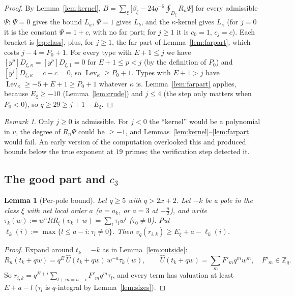 \documentclass{amsart}
\newtheorem{lemma}[theorem]{Lemma}
\theoremstyle{definition}
\theoremstyle{remark}
\newtheorem{remark}[theorem]{Remark}
\numberwithin{equation}{section}
\newcommand{\Z}{\mathbb{Z}}
\newcommand{\Lev}{\operatorname{Lev}}
\begin{document}
\begin{proof}
By Lemma~\ref{lem:kernel},
$B=\sum_\xi\bigl[\beta_\xi-24q^{-5}\oint_{D_\xi}R_n\Psi\bigr]$ for every
admissible $\Psi$: $\Psi=0$ gives the bound $L_a$, $\Psi=1$ gives $L_b$, and
the $\kappa$-kernel gives $L_\kappa$ (for $j=0$ it is the constant
$\Psi=1+c$, with no far part; for $j\ge1$ it is $c_0=1$, $c_j=c$). Each
bracket is \eqref{eq:class}, plus, for $j\ge1$, the far part of
Lemma~\ref{lem:farpart}, which costs $j-4=P_0+1$. For every type with
$E+1\le j$ we have $[y^p]D_{\xi,\kappa}=[y^p]D_{\xi,1}=0$ for $E+1\le p<j$
(by the definition of $P_0$) and $[y^j]D_{\xi,\kappa}=c-c=0$, so
$\Lev_\kappa\ge P_0+1$. Types with $E+1>j$ have
$\Lev_\kappa\ge-5+E+1\ge P_0+1$ whatever $\kappa$ is. Lemma~\ref{lem:farpart}
applies, because $E_\xi\ge-10$ (Lemma~\ref{lem:crude}) and $j\le4$ (the step
only matters when $P_0<0$), so $q\ge29\ge j+1-E_\xi$.
\end{proof}

\begin{remark}\label{rem:j-negative}
Only $j\ge0$ is admissible. For $j<0$ the ``kernel'' would be a polynomial in
$v$, the degree of $R_n\Psi$ could be $\ge-1$, and
Lemmas~\ref{lem:kernel}--\ref{lem:farpart} would fail. An early version of the
computation overlooked this and produced bounds below the true exponent at
$19$ primes; the verification step detected it.
\end{remark}

\subsection{The good part and \texorpdfstring{$c_3$}{c3}}\label{ss:good}

\begin{lemma}[Per-pole bound]\label{lem:perpole}
Let $q\ge5$ with $q>2x+2$. Let $-k$ be a pole in the class $\xi$ with net local
order $a$ ($a=a_k$, or $a=3$ at $-\frac n2$), and write
$\tau_k(w):=w^aRR_\xi(v_k+w)=\sum_l\tau_lw^l$ ($\tau_0\ne0$). Put
$\ell_k(i):=\max\{l\le a-i:\tau_l\ne0\}$. Then
$v_q(r_{i,k})\ge E_\xi+a-\ell_k(i)$.
\end{lemma}

\begin{proof}
Expand around $t_k=-k$ as in Lemma~\ref{lem:outside}:
\[
  R_n(t_k+qw)=q^E\,\hat U(t_k+qw)\,w^{-a}\tau_k(w),\qquad
  \hat U(t_k+qw)=\sum_mF'_mq^mw^m,\quad F'_m\in\Z_q .
\]
So
$r_{i,k}=q^{E+i}\sum_{l+m=a-i}F'_mq^m\tau_l$, and every term has valuation at
least $E+a-l$ ($\tau_l$ is $q$-integral by Lemma~\ref{lem:sizes}).
\end{proof}
\end{document}
